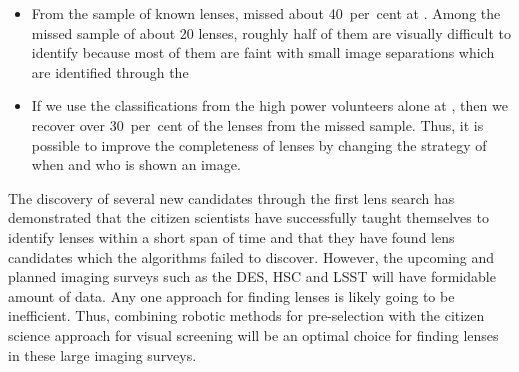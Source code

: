 \documentclass[useAMS,usenatbib,a4paper]{mn2e}
\begin{document}
\begin{itemize}
\item From the sample of known lenses, \sw missed about 40~per~cent at \StageOne.
Among the missed sample of about 20 lenses, roughly half of them are
visually difficult to identify because most of them are faint with small
image separations which are identified through the \rf

\item If we use the classifications from the high power volunteers alone
at \StageOne, then we recover over 30~per~cent of the lenses from the missed
sample. Thus, it is possible to improve the completeness of lenses by
changing the strategy of when and who is shown an image.

\end{itemize}

The discovery of several new candidates through the first \sw lens
search has demonstrated that the citizen scientists have successfully
taught themselves to identify lenses within a short span of time and
that they have found lens candidates which the algorithms failed to
discover.  However, the upcoming and planned imaging surveys such as the
DES, HSC and LSST will have formidable amount of data. Any one approach
for finding lenses is likely going to be inefficient. Thus, combining
robotic methods for pre-selection with the citizen science approach for
visual screening will be an optimal choice for finding lenses in these
large imaging surveys.
\end{document}

